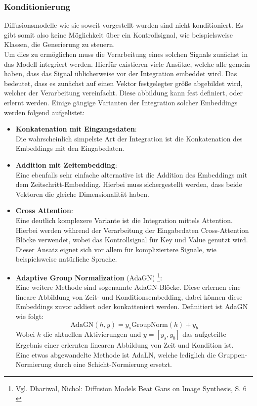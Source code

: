 \subsubsection{Konditionierung}

Diffusionsmodelle wie sie soweit vorgestellt wurden sind nicht konditioniert. Es gibt somit also keine Möglichkeit über ein Kontrollsignal, wie beispielsweise Klassen, die Generierung zu steuern. \\
Um dies zu ermöglichen muss die Verarbeitung eines solchen Signals zunächst in das Modell integriert werden. Hierfür existieren viele Ansätze, welche alle gemein haben, dass das Signal üblicherweise vor der Integration embeddet wird. Das bedeutet, dass es zunächst auf einen Vektor festgelegter größe abgebildet wird, welcher der Verarbeitung vereinfacht. Diese abbildung kann fest definiert, oder erlernt werden. Einige gängige Varianten der Integration solcher Embeddings werden folgend aufgelistet:
\begin {itemize}
    \item \textbf{Konkatenation mit Eingangsdaten}: \\
    Die wahrscheinlich simpelste Art der Integration ist die Konkatenation des Embeddings mit den Eingabedaten.
    \item \textbf{Addition mit Zeitembedding}: \\
    Eine ebenfalls sehr einfache alternative ist die Addition des Embeddings mit dem Zeitschritt-Embedding. Hierbei muss sichergestellt werden, dass beide Vektoren die gleiche Dimensionalität haben.
    \item \textbf{Cross Attention}: \\
    Eine deutlich komplexere Variante ist die Integration mittels Attention. Hierbei werden während der Verarbeitung der Eingabedaten Cross-Attention Blöcke verwendet, wobei das Kontrollsignal für Key und Value genutzt wird. Dieser Ansatz eignet sich vor allem für kompliziertere Signale, wie beispielsweise natürliche Sprache.
    \item \textbf{Adaptive Group Normalization} (AdaGN) \footnote{
        Vgl. Dhariwal, Nichol: Diffusion Models Beat Gans on Image Synthesis, S. 6
        \cite{NEURIPS2021_49ad23d1}
    }: \\
    Eine weitere Methode sind sogenannte \ac{AdaGN}-Blöcke. Diese erlernen eine lineare Abbildung von Zeit- und Konditionsembedding, dabei können diese Embeddings zuvor addiert oder konkatteniert werden. Definitiert ist \ac{AdaGN} wie folgt:
    \begin{equation}
        \text{AdaGN}(h,y) = y_s \text{GroupNorm}(h) + y_b
    \end{equation}
    Wobei $h$ die aktuellen Aktivierungen und $y=[y_s, y_b]$ das aufgeteilte Ergebnis einer erlernten linearen Abbildung von Zeit und Kondition ist. \\
    Eine etwas abgewandelte Methode ist \ac{AdaLN}, welche lediglich die Gruppen-Normierung durch eine Schicht-Normierung ersetzt.    
\end {itemize}  
